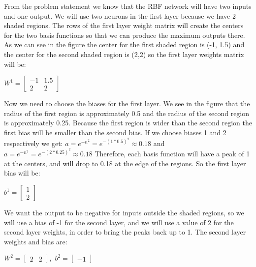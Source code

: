 \documentclass{article}
\begin{document}
\noindent From the problem statement we know that the RBF network will have two inputs and one output.
We will use two neurons in the first layer because we have 2 shaded regions. 
The rows of the first layer weight matrix
will create the centers for the two basis functions so that we can produce the maximum outputs there. 
As we can see in the figure the center for the first shaded region
is (-1, 1.5) and the center for the second shaded region is (2,2) so the first layer weights matrix will be: \\
\begin{center}
  
$ W^1 = \begin{bmatrix}
  - 1 & 1.5 \\
  2 & 2
\end{bmatrix} $
\end{center}

\noindent Now we need to choose the biases for the first layer. We see in the figure that the radius of the first 
region is approximately 0.5 and the radius of the second region is approximately 0.25. 
Because the first region is wider than the second region the first bias will be smaller than the second bias.
If we choose biases 1 and 2 respectively we get:
$a = e^{-n^2}= e^{-(1*0.5)^2} \approx 0.18$ and $a = e^{-n^2}= e^{-(2*0.25)^2} \approx 0.18$
Therefore, each basis function will have a peak of 1 at the centers, and will drop to 0.18 at the edge of the regions.
So the first layer bias will be:
\begin{center}
  
  $ b^1 = \begin{bmatrix}
    1 \\
    2 
  \end{bmatrix} $
  \end{center}

  \noindent We want the output to be negative for inputs outside the shaded regions,
  so we will use a bias of -1 for the second layer, and we will use a value of 2
  for the second layer weights, in order to bring the peaks back up to 1. The second layer weights and bias are:

  \begin{center}
  
    $ W^2 = \begin{bmatrix}
      2 & 2
    \end{bmatrix},
     $
    $ b^2 = \begin{bmatrix}
      -1
    \end{bmatrix} $

    \end{center}
  
\end{document}

